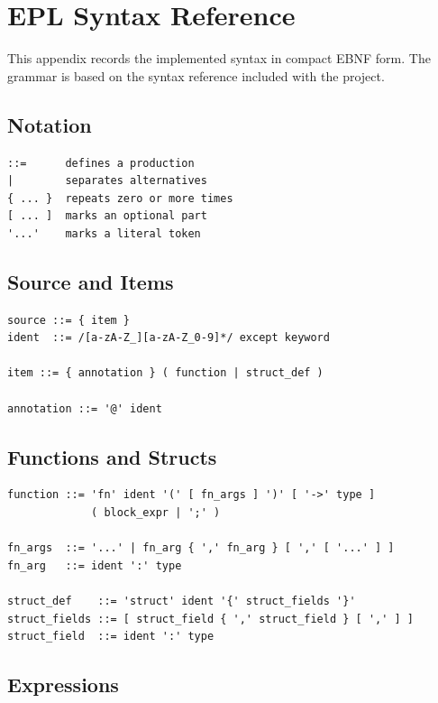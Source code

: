 \chapter{EPL Syntax Reference}
\label{app:syntax}

This appendix records the implemented syntax in compact EBNF form. The grammar
is based on the syntax reference included with the project.

\section{Notation}

\begin{lstlisting}[caption={Grammar notation}]
::=      defines a production
|        separates alternatives
{ ... }  repeats zero or more times
[ ... ]  marks an optional part
'...'    marks a literal token
\end{lstlisting}

\section{Source and Items}

\begin{lstlisting}[caption={Top-level grammar}]
source ::= { item }
ident  ::= /[a-zA-Z_][a-zA-Z_0-9]*/ except keyword

item ::= { annotation } ( function | struct_def )

annotation ::= '@' ident
\end{lstlisting}

\section{Functions and Structs}

\begin{lstlisting}[caption={Function and struct grammar}]
function ::= 'fn' ident '(' [ fn_args ] ')' [ '->' type ]
             ( block_expr | ';' )

fn_args  ::= '...' | fn_arg { ',' fn_arg } [ ',' [ '...' ] ]
fn_arg   ::= ident ':' type

struct_def    ::= 'struct' ident '{' struct_fields '}'
struct_fields ::= [ struct_field { ',' struct_field } [ ',' ] ]
struct_field  ::= ident ':' type
\end{lstlisting}

\section{Expressions}


